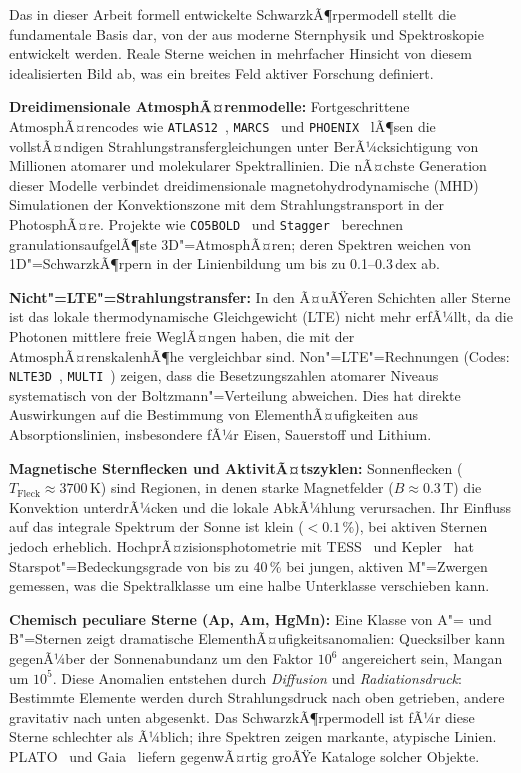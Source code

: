 ﻿\documentclass[a4paper,12pt]{article}
\theoremstyle{definition}
\begin{document}
Das in dieser Arbeit formell entwickelte SchwarzkÃ¶rpermodell stellt die
fundamentale Basis dar, von der aus moderne Sternphysik und Spektroskopie
entwickelt werden. Reale Sterne weichen in mehrfacher Hinsicht von diesem
idealisierten Bild ab, was ein breites Feld aktiver Forschung definiert.

\textbf{Dreidimensionale AtmosphÃ¤renmodelle:}
Fortgeschrittene AtmosphÃ¤rencodes wie \texttt{ATLAS12}~\cite{kurucz1993},
\texttt{MARCS}~\cite{gustafsson2008} und \texttt{PHOENIX}~\cite{hauschildt1999}
lÃ¶sen die vollstÃ¤ndigen Strahlungstransfergleichungen unter BerÃ¼cksichtigung
von Millionen atomarer und molekularer Spektrallinien. Die nÃ¤chste Generation
dieser Modelle verbindet dreidimensionale magnetohydrodynamische (MHD) Simulationen
der Konvektionszone mit dem Strahlungstransport in der PhotosphÃ¤re.
Projekte wie \texttt{CO5BOLD}~\cite{freytag2012} und \texttt{Stagger}~\cite{magic2013}
berechnen granulationsaufgelÃ¶ste 3D"=AtmosphÃ¤ren; deren Spektren weichen von
1D"=SchwarzkÃ¶rpern in der Linienbildung um bis zu 0.1--0.3\,dex ab.

\textbf{Nicht"=LTE"=Strahlungstransfer:}
In den Ã¤uÃŸeren Schichten aller Sterne ist das lokale thermodynamische
Gleichgewicht (LTE) nicht mehr erfÃ¼llt, da die Photonen mittlere freie
WeglÃ¤ngen haben, die mit der AtmosphÃ¤renskalenhÃ¶he vergleichbar sind.
Non"=LTE"=Rechnungen (Codes: \texttt{NLTE3D}~\cite{bergemann2012},
\texttt{MULTI}~\cite{carlsson1986}) zeigen, dass die Besetzungszahlen
atomarer Niveaus systematisch von der Boltzmann"=Verteilung abweichen.
Dies hat direkte Auswirkungen auf die Bestimmung von ElementhÃ¤ufigkeiten
aus Absorptionslinien, insbesondere fÃ¼r Eisen, Sauerstoff und Lithium.

\textbf{Magnetische Sternflecken und AktivitÃ¤tszyklen:}
Sonnenflecken ($T_{\text{Fleck}} \approx 3700\,\text{K}$) sind Regionen,
in denen starke Magnetfelder ($B \approx 0.3\,\text{T}$) die Konvektion
unterdrÃ¼cken und die lokale AbkÃ¼hlung verursachen. Ihr Einfluss auf das
integrale Spektrum der Sonne ist klein ($< 0.1\,\%$), bei aktiven Sternen
jedoch erheblich. HochprÃ¤zisionsphotometrie mit TESS~\cite{ricker2015}
und Kepler~\cite{borucki2010} hat Starspot"=Bedeckungsgrade von bis zu
40\,\% bei jungen, aktiven M"=Zwergen gemessen, was die Spektralklasse
um eine halbe Unterklasse verschieben kann.

\textbf{Chemisch peculiare Sterne (Ap, Am, HgMn):}
Eine Klasse von A"= und B"=Sternen zeigt dramatische
ElementhÃ¤ufigkeitsanomalien: Quecksilber kann gegenÃ¼ber der Sonnenabundanz
um den Faktor $10^6$ angereichert sein, Mangan um $10^5$.
Diese Anomalien entstehen durch \emph{Diffusion} und \emph{Radiationsdruck}:
Bestimmte Elemente werden durch Strahlungsdruck nach oben getrieben,
andere gravitativ nach unten abgesenkt. Das SchwarzkÃ¶rpermodell ist
fÃ¼r diese Sterne schlechter als Ã¼blich; ihre Spektren zeigen markante,
atypische Linien. PLATO~\cite{rauer2014} und Gaia~\cite{prusti2016}
liefern gegenwÃ¤rtig groÃŸe Kataloge solcher Objekte.
\end{document}
